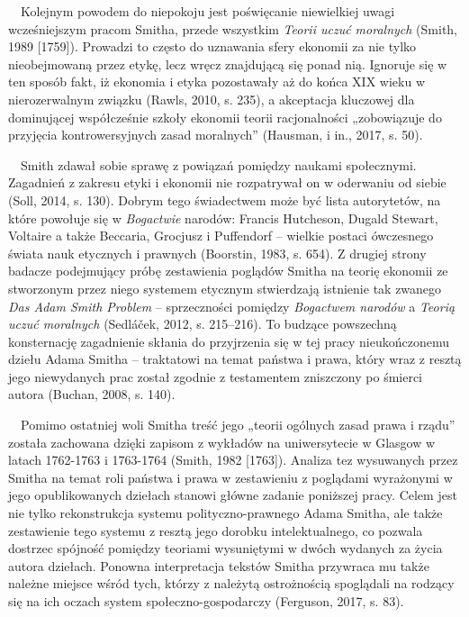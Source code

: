 \documentclass[a4paper]{article}
\begin{document}
 \ \ Kolejnym powodem do niepokoju jest poświęcanie niewielkiej uwagi wcześniejszym pracom Smitha, przede wszystkim \textit{Teorii uczuć moralnych }\label{ref:RNDuvnqXhGdwl}(Smith, 1989 [1759]). Prowadzi to często do uznawania sfery ekonomii za nie tylko nieobejmowaną przez etykę, lecz wręcz znajdującą się ponad nią. Ignoruje się w ten sposób fakt, iż ekonomia i etyka pozostawały aż do końca XIX wieku w nierozerwalnym związku \label{ref:RNDifRkgFWC39}(Rawls, 2010, s. 235), a akceptacja kluczowej dla dominującej współcześnie szkoły ekonomii teorii racjonalności „zobowiązuje do przyjęcia kontrowersyjnych zasad moralnych” \label{ref:RNDHRnH8e5vNp}(Hausman, i in., 2017, s. 50). 

 \ \ Smith zdawał sobie sprawę z powiązań pomiędzy naukami społecznymi. Zagadnień z zakresu etyki i ekonomii nie rozpatrywał on w oderwaniu od siebie \label{ref:RNDc7lad85KL1}(Soll, 2014, s. 130). Dobrym tego świadectwem może być lista autorytetów, na które powołuje się w \textit{Bogactwie }narodów: Francis Hutcheson, Dugald Stewart, Voltaire a także Beccaria, Grocjusz i Puffendorf – wielkie postaci ówczesnego świata nauk etycznych i prawnych \label{ref:RNDYwU1DwRdXl}(Boorstin, 1983, s. 654). Z drugiej strony badacze podejmujący próbę zestawienia poglądów Smitha na teorię ekonomii ze stworzonym przez niego systemem etycznym stwierdzają istnienie tak zwanego \textit{Das Adam Smith Problem} – sprzeczności pomiędzy \textit{Bogactwem narodów} a \textit{Teorią uczuć moralnych }\label{ref:RNDVh9gEUItJS}(Sedláček, 2012, s. 215–216). To budzące powszechną konsternację zagadnienie skłania do przyjrzenia się w tej pracy nieukończonemu dziełu Adama Smitha – traktatowi na temat państwa i prawa, który wraz z resztą jego niewydanych prac został zgodnie z testamentem zniszczony po śmierci autora \label{ref:RNDsGGYAWrkxh}(Buchan, 2008, s. 140). 

 \ \ Pomimo ostatniej woli Smitha treść jego „teorii ogólnych zasad prawa i rządu” została zachowana dzięki zapisom z wykładów na uniwersytecie w Glasgow w latach 1762-1763 i 1763-1764 \label{ref:RNDDaJwKBJe61}(Smith, 1982 [1763]). Analiza tez wysuwanych przez Smitha na temat roli państwa i prawa w zestawieniu z poglądami wyrażonymi w jego opublikowanych dziełach stanowi główne zadanie poniższej pracy. Celem jest nie tylko rekonstrukcja systemu polityczno-prawnego Adama Smitha, ale także zestawienie tego systemu z resztą jego dorobku intelektualnego, co pozwala dostrzec spójność pomiędzy teoriami wysuniętymi w dwóch wydanych za życia autora dziełach. Ponowna interpretacja tekstów Smitha przywraca mu także należne miejsce wśród tych, którzy z należytą ostrożnością spoglądali na rodzący się na ich oczach system społeczno-gospodarczy \label{ref:RNDsLlADmbRUC}(Ferguson, 2017, s. 83).
\end{document}
